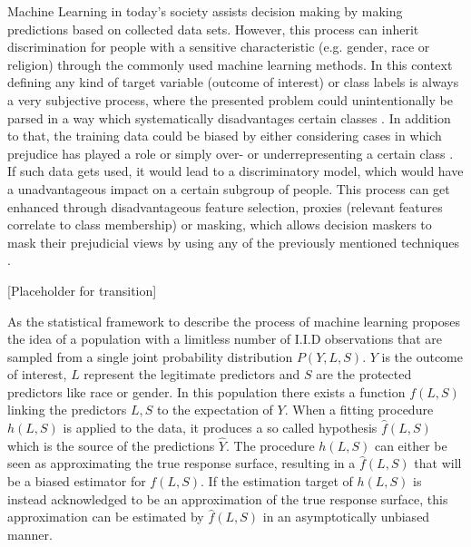 Machine Learning in today's society assists decision making by making predictions based on collected data sets. However, this process can inherit discrimination for people with a sensitive characteristic (e.g. gender, race or religion) through the commonly used machine learning methods.
In this context defining any kind of target variable (outcome of interest) or class labels is always a very subjective process, where 
the presented problem could unintentionally be parsed in a way which systematically disadvantages 
certain classes \cite{Barocas.2016, barocas-hardt-narayanan}. In addition to that, the training data could be biased by 
either considering cases in which prejudice has played a role or simply over- or underrepresenting 
a certain class \cite{Barocas.2016, barocas-hardt-narayanan}. If such data gets used, it would lead to a discriminatory model, which would have a unadvantageous impact on a certain subgroup of people. This process can get enhanced through disadvantageous feature selection, proxies (relevant features correlate to class membership) or masking, which allows decision maskers to mask their prejudicial views by using any of the previously mentioned techniques \cite{Barocas.2016, barocas-hardt-narayanan}.  

[Placeholder for transition]

As the statistical framework to describe the process of machine learning \cite{Berk.2018} 
proposes the idea of a population with a limitless number of I.I.D observations that are 
sampled from a single joint probability distribution $P(Y,L,S)$. 
$Y$ is the outcome of interest, $L$ represent the legitimate predictors and $S$ are the 
protected predictors like race or gender. In this population there exists a function $f(L,S)$ 
linking the predictors $L,S$ to the expectation of $Y$. When a fitting procedure $h(L,S)$ 
is applied to the data, it produces a so called hypothesis $\hat{f}(L,S)$ which is the 
source of the predictions $\hat{Y}$. The procedure $h(L,S)$ can either be seen as 
approximating the true response surface, resulting in a $\hat{f}(L,S)$ that will be a biased 
estimator for $f(L,S)$. If the estimation target of $h(L,S)$ is instead acknowledged to be 
an approximation of the true response surface, this approximation can be estimated by 
$\hat{f}(L,S)$ in an asymptotically unbiased manner.